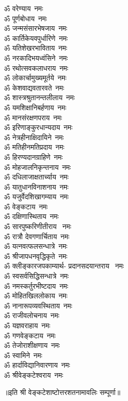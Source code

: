 \begin{multicols}{2}
\begin{flushleft}
        ॐ वरेण्याय~नमः\\
        ॐ पूर्णबोधाय~नमः\\
        ॐ जन्मसंसारभेषजाय~नमः\\
        ॐ कार्तिकेयवपुर्धारिणे~नमः\\
        ॐ यतिशेखरभाविताय~नमः\\
        ॐ नरकादिभयध्वंसिने~नमः\\
        ॐ रथोत्सवकलाधराय~नमः\\
        ॐ लोकार्चामुख्यमूर्तये~नमः\\
        ॐ केशवाद्यवतारवते~नमः\hfill{}\\
                                                        
        ॐ शास्त्रश्रुतानन्तलीलाय~नमः\\
        ॐ यमशिक्षानिबर्हणाय~नमः\\
        ॐ मानसंरक्षणपराय~नमः\\
        ॐ इरिणाङ्कुरधान्यदाय~नमः\\
        ॐ नेत्रहीनाक्षिदायिने~नमः\\
        ॐ मतिहीनमतिप्रदाय~नमः\\
        ॐ हिरण्यदानग्राहिणे~नमः\\
        ॐ मोहजालनिकृन्तनाय~नमः\\
        ॐ दधिलाजाक्षतार्च्याय~नमः\\
        ॐ यातुधानविनाशनाय~नमः\hfill{}\\
                                                        
        ॐ यजुर्वेदशिखागम्याय~नमः\\
        ॐ वेङ्कटाय~नमः\\
        ॐ दक्षिणास्थिताय~नमः\\
        ॐ सारपुष्करिणीतीराय ~नमः\\
        ॐ रात्रौ  देवगणार्चिताय~नमः\\
        ॐ यत्नवत्फलसन्धात्रे~नमः\\
        ॐ श्रीजापधनवृद्धिकृते~नमः\\
        ॐ क्लीङ्कारजपकाम्यार्थ-
        प्रदानसदयान्तराय ~नमः\\
        ॐ स्वसर्वसिद्धिसन्धात्रे~नमः\\
        ॐ नमस्कर्तुरभीष्टदाय~नमः\hfill{}\\
        
        ॐ मोहितखिललोकाय~नमः\\
        ॐ नानारूपव्यवस्थिताय~नमः\\
        ॐ राजीवलोचनाय~नमः\\
        ॐ यज्ञवराहाय~नमः\\
        ॐ गणवेङ्कटाय~नमः\\
        ॐ तेजोराशीक्षणाय~नमः\\
        ॐ स्वामिने~नमः\\
        ॐ हार्दाविद्यानिवारणाय~नमः\hfill{}\\
        ॐ श्रीवेङ्कटेश्वराय~नमः\\
    \end{flushleft}
\end{multicols}
॥इति श्री वेङ्कटेशाष्टोत्तरशतनामावलिः सम्पूर्णा॥
